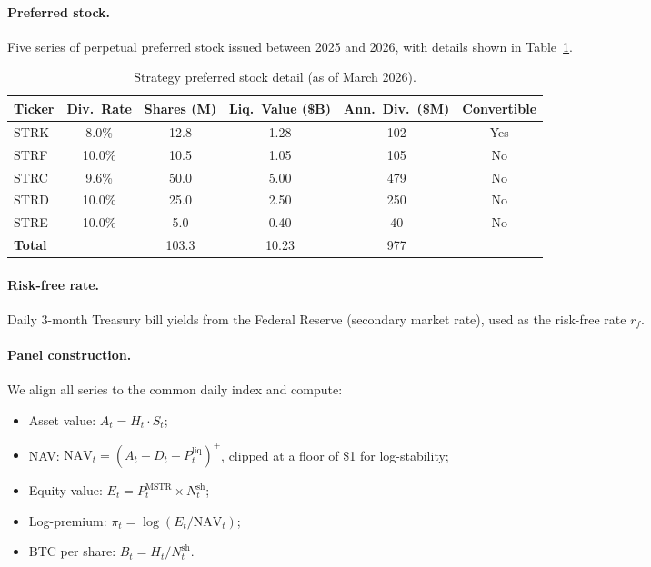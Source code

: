 \paragraph{Preferred stock.}
Five series of perpetual preferred stock issued between 2025 and 2026,
with details shown in Table~\ref{tab:preferred}.

\begin{table}[H]
\centering
\caption{Strategy preferred stock detail (as of March 2026).}
\label{tab:preferred}
\begin{tabular}{@{}lccccc@{}}
\toprule
\textbf{Ticker} & \textbf{Div.\ Rate} & \textbf{Shares (M)} &
\textbf{Liq.\ Value (\$B)} & \textbf{Ann.\ Div.\ (\$M)} &
\textbf{Convertible} \\
\midrule
STRK  & 8.0\%  & 12.8  & 1.28  & 102   & Yes \\
STRF  & 10.0\% & 10.5  & 1.05  & 105   & No \\
STRC  & 9.6\%  & 50.0  & 5.00  & 479   & No \\
STRD  & 10.0\% & 25.0  & 2.50  & 250   & No \\
STRE  & 10.0\% &  5.0  & 0.40  &  40   & No \\
\midrule
\textbf{Total} & & 103.3 & 10.23 & 977 & \\
\bottomrule
\end{tabular}
\end{table}

\paragraph{Risk-free rate.}
Daily 3-month Treasury bill yields from the Federal Reserve
(secondary market rate), used as the risk-free rate $r_f$.

\paragraph{Panel construction.}
We align all series to the common daily index and compute:
\begin{itemize}
  \item Asset value: $A_t = H_t \cdot S_t$;
  \item NAV: $\mathrm{NAV}_t = (A_t - D_t - P_t^{\mathrm{liq}})^+$,
    clipped at a floor of \$1 for log-stability;
  \item Equity value: $E_t = P_t^{\mathrm{MSTR}} \times N_t^{\mathrm{sh}}$;
  \item Log-premium: $\pi_t = \log(E_t / \mathrm{NAV}_t)$;
  \item BTC per share: $B_t = H_t / N_t^{\mathrm{sh}}$.
\end{itemize}

